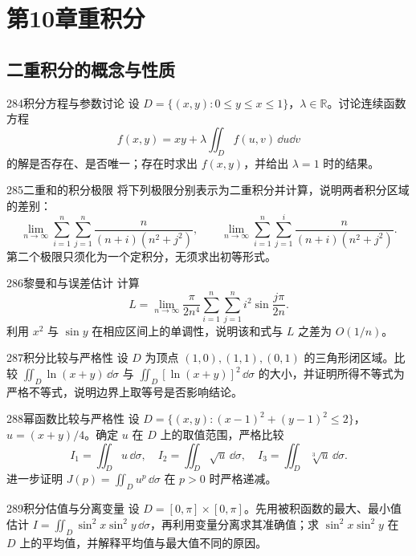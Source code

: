 \section{第10章\quad 重积分}
\subsection{二重积分的概念与性质}

\begin{exercise}{284}{积分方程与参数讨论}
设 $D=\{(x,y):0\leq y\leq x\leq1\}$，$\lambda\in\mathbb R$。讨论连续函数方程
\[
 f(x,y)=xy+\lambda\iint_D f(u,v)\,\dd u\dd v
\]
的解是否存在、是否唯一；存在时求出 $f(x,y)$，并给出 $\lambda=1$ 时的结果。
\end{exercise}

\begin{exercise}{285}{二重和的积分极限}
将下列极限分别表示为二重积分并计算，说明两者积分区域的差别：
\[
 \lim_{n\to\infty}\sum_{i=1}^n\sum_{j=1}^n
 \frac{n}{(n+i)(n^2+j^2)},\qquad
 \lim_{n\to\infty}\sum_{i=1}^n\sum_{j=1}^i
 \frac{n}{(n+i)(n^2+j^2)}.
\]
第二个极限只须化为一个定积分，无须求出初等形式。
\end{exercise}

\begin{exercise}{286}{黎曼和与误差估计}
计算
\[
 L=\lim_{n\to\infty}\frac{\pi}{2n^4}
 \sum_{i=1}^n\sum_{j=1}^n i^2\sin\frac{j\pi}{2n}.
\]
利用 $x^2$ 与 $\sin y$ 在相应区间上的单调性，说明该和式与 $L$ 之差为 $O(1/n)$。
\end{exercise}

\begin{exercise}{287}{积分比较与严格性}
设 $D$ 为顶点 $(1,0),(1,1),(0,1)$ 的三角形闭区域。比较
$\iint_D\ln(x+y)\,\dd\sigma$ 与 $\iint_D[\ln(x+y)]^2\,\dd\sigma$ 的大小，并证明所得不等式为严格不等式，说明边界上取等号是否影响结论。
\end{exercise}

\begin{exercise}{288}{幂函数比较与严格性}
设 $D=\{(x,y):(x-1)^2+(y-1)^2\leq2\}$，$u=(x+y)/4$。确定 $u$ 在 $D$ 上的取值范围，严格比较
\[
 I_1=\iint_Du\,\dd\sigma,\quad I_2=\iint_D\sqrt u\,\dd\sigma,\quad I_3=\iint_D\sqrt[3]u\,\dd\sigma.
\]
进一步证明 $J(p)=\iint_Du^p\,\dd\sigma$ 在 $p>0$ 时严格递减。
\end{exercise}

\begin{exercise}{289}{积分估值与分离变量}
设 $D=[0,\pi]\times[0,\pi]$。先用被积函数的最大、最小值估计
$I=\iint_D\sin^2x\sin^2y\,\dd\sigma$，再利用变量分离求其准确值；求 $\sin^2x\sin^2y$ 在 $D$ 上的平均值，并解释平均值与最大值不同的原因。
\end{exercise}

